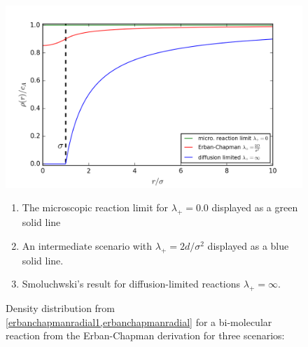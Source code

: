 \documentclass[
  a4paper,BCOR10mm,oneside,
  headsepline,footsepline,%
  fleqn,openbib
]{scrbook}
\begin{document}
\begin{figure}[h!]
\captionsetup{singlelinecheck=off}
\centering
\includegraphics[width=\textwidth]{./data/smoluchowskierban.png}
\caption{Density distribution from \cref{erbanchapmanradial1,erbanchapmanradial} for a bi-molecular reaction from the Erban-Chapman derivation for three scenarios:}
\begin{small}
\begin{enumerate}
  \item The microscopic reaction limit for $\lambda_{+} =0.0$ displayed as a green solid line
  \item An intermediate scenario with $\lambda_{+} =2d/\sigma^2$ displayed as a blue solid line.
  \item Smoluchwski's result for diffusion-limited reactions   $\lambda_{+}=\infty $.
\end{enumerate}
\end{small}
  \label{fig:diffusion_limit-Erban-Chapmann-figure}
\end{figure}
\end{document}
